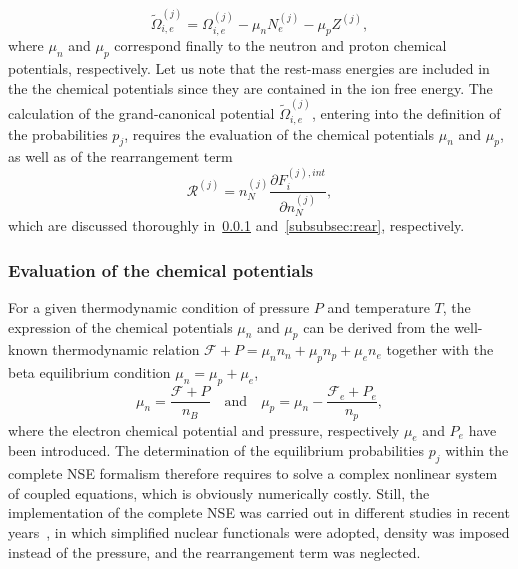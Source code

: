 %
\begin{equation}
  \tilde{\Omega}_{i,e}^{(j)} = \Omega_{i,e}^{(j)} - \mu_n N_e^{(j)} -
  \mu_p Z^{(j)},
\end{equation}
%
where $\mu_n$ and $\mu_p$ correspond finally to the neutron and proton 
chemical potentials, respectively. Let us note that the rest-mass energies are 
included in the the chemical potentials since they are contained in the ion 
free energy. 
The calculation of the grand-canonical potential $\tilde{\Omega}_{i,e}^{(j)}$, 
entering into the definition of the probabilities $p_j$, requires the 
evaluation of the chemical potentials $\mu_n$ and $\mu_p$, as well as of the 
rearrangement term
%
\begin{equation}
  \mathcal{R}^{(j)} = n_N^{(j)} 
  \frac{\partial F_i^{(j),int}}{\partial n_N^{(j)}},
\end{equation}
%
which are discussed thoroughly in~\ref{subsubsec:chempoteval}
and~\ref{subsubsec:rear}, respectively.

\subsubsection{Evaluation of the chemical
potentials}\label{subsubsec:chempoteval}

For a given thermodynamic condition of pressure $P$ and temperature $T$, the
expression of the chemical potentials $\mu_n$ and $\mu_p$ can be derived from 
the well-known thermodynamic relation $\mathcal{F} + P = \mu_n n_n + \mu_p n_p 
+ \mu_e n_e$ together with the beta equilibrium condition $\mu_n = \mu_p + 
\mu_e$,
%
\begin{equation}
  \mu_n = \frac{\mathcal{F} + P}{n_B} \quad \text{and} \quad
  \mu_p = \mu_n - \frac{\mathcal{F}_e + P_e}{n_p},\label{eq:munmup}
\end{equation}
%
where the electron chemical potential and pressure, respectively $\mu_e$ and
$P_e$ have been introduced.
The determination of the equilibrium probabilities $p_j$ within the complete
NSE formalism therefore requires to solve a complex nonlinear system of coupled 
equations, which is obviously numerically costly. Still, the implementation of 
the complete NSE was carried out in different studies in recent
years~\cite{Oertel2017,Burgio2018}, in which simplified nuclear functionals 
were adopted, density was imposed instead of the pressure, and the 
rearrangement term was neglected.

